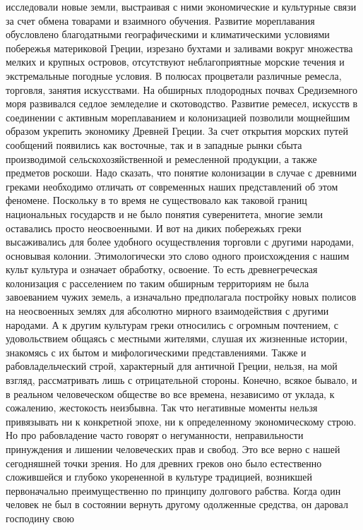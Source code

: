 исследовали новые земли, выстраивая с ними экономические и культурные связи за
счет обмена товарами и взаимного обучения. Развитие мореплавания обусловлено
благодатными географическими и климатическими условиями побережья материковой
Греции, изрезано бухтами и заливами вокруг множества мелких и крупных островов,
отсутствуют неблагоприятные морские течения и экстремальные погодные условия. В
полюсах процветали различные ремесла, торговля, занятия искусствами. На обширных
плодородных почвах Средиземного моря развивался седлое земледелие и
скотоводство. Развитие ремесел, искусств в соединении с активным мореплаванием и
колонизацией позволили мощнейшим образом укрепить экономику Древней Греции. За
счет открытия морских путей сообщений появились как восточные, так и в западные
рынки сбыта производимой сельскохозяйственной и ремесленной продукции, а также
предметов роскоши. Надо сказать, что понятие колонизации в случае с древними
греками необходимо отличать от современных наших представлений об этом феномене.
Поскольку в то время не существовало как таковой границ национальных государств
и не было понятия суверенитета, многие земли оставались просто неосвоенными. И
вот на диких побережьях греки высаживались для более удобного осуществления
торговли с другими народами, основывая колонии. Этимологически это слово одного
происхождения с нашим культ культура и означает обработку, освоение. То есть
древнегреческая колонизация с расселением по таким обширным территориям не была
завоеванием чужих земель, а изначально предполагала постройку новых полисов на
неосвоенных землях для абсолютно мирного взаимодействия с другими народами. А к
другим культурам греки относились с огромным почтением, с удовольствием общаясь
с местными жителями, слушая их жизненные истории, знакомясь с их бытом и
мифологическими представлениями. Также и рабовладельческий строй, характерный
для античной Греции, нельзя, на мой взгляд, рассматривать лишь с отрицательной
стороны. Конечно, всякое бывало, и в реальном человеческом обществе во все
времена, независимо от уклада, к сожалению, жестокость неизбывна. Так что
негативные моменты нельзя привязывать ни к конкретной эпохе, ни к определенному
экономическому строю. Но про рабовладение часто говорят о негуманности,
неправильности принуждения и лишении человеческих прав и свобод. Это все верно с
нашей сегодняшней точки зрения. Но для древних греков оно было естественно
сложившейся и глубоко укорененной в культуре традицией, возникшей первоначально
преимущественно по принципу долгового рабства. Когда один человек не был в
состоянии вернуть другому одолженные средства, он даровал господину свою
